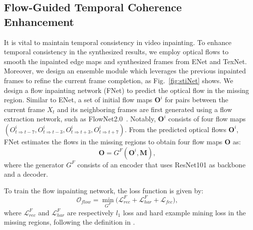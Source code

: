 \subsection{Flow-Guided Temporal Coherence Enhancement}
\label{sec:fec}
It is vital to maintain temporal consistency in video inpainting.
To enhance temporal consistency in the synthesized results, we employ optical flows to smooth the inpainted edge maps and synthesized frames from ENet and TexNet.
Moreover, we design an ensemble module which leverages the previous inpainted frames to refine the current frame completion, as Fig.~\ref{fig:stiNet} shows. 
%
We design a flow inpainting network (FNet) to predict the optical flow in the missing region.
%
Similar to ENet, a set of initial flow maps \(\boldsymbol{O}^i\) for pairs between the current frame $X_t$ and its neighboring frames are first generated using a flow extraction network, such as FlowNet2.0~\cite{Flownet_2017_CVPR}.
Notably, \(\boldsymbol{O}^i\) consists of four flow maps \((O^i_{t\Rightarrow t-7}, O^i_{t\Rightarrow t-3}, O^i_{t\Rightarrow t+3}, O^i_{t\Rightarrow t+7})\).
From the predicted optical flows $\boldsymbol{O}^i$, FNet estimates the flows in the missing regions to obtain four flow maps \(\boldsymbol{O}\) as:
\begin{equation}
	\label{eq:flownet}
	\boldsymbol{O}=G^F(\boldsymbol{O}^{i},\boldsymbol{M}),
\end{equation}
where the generator $G^F$ consists of an encoder that uses ResNet101 \cite{He_2016_CVPR} as backbone and a decoder.

To train the flow inpainting network, the loss function is given by:
\begin{equation}
	\label{eq:flow_all}
	\mathcal{O}_{flow}=\min\limits_{G^F} \big(\mathcal{L}^F_{rec}+ \mathcal{L}^F_{har}+\mathcal{L}_{fec}\big),
\end{equation}
where $\mathcal{L}^F_{rec}$ and $\mathcal{L}^F_{har}$ are respectively $l_1$ loss and hard example mining loss in the missing regions, following the definition in \cite{Xu_2019_CVPR}. 




